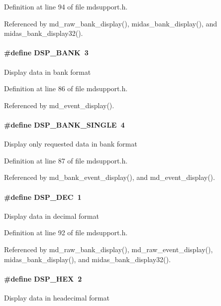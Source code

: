 Definition at line 94 of file mdsupport.h.

Referenced by md\_\-raw\_\-bank\_\-display(), midas\_\-bank\_\-display(), and midas\_\-bank\_\-display32().
\paragraph[{DSP\_\-BANK}]{\setlength{\rightskip}{0pt plus 5cm}\#define DSP\_\-BANK~3}\hfill\label{group__mdsupportdefineh_gab226417737baf78d3965f812b2c58b53}
Display data in bank format 

Definition at line 86 of file mdsupport.h.

Referenced by md\_\-event\_\-display().
\paragraph[{DSP\_\-BANK\_\-SINGLE}]{\setlength{\rightskip}{0pt plus 5cm}\#define DSP\_\-BANK\_\-SINGLE~4}\hfill\label{group__mdsupportdefineh_ga818a76e5aea53754826cdf8753c5e94f}
Display only requested data in bank format 

Definition at line 87 of file mdsupport.h.

Referenced by md\_\-bank\_\-event\_\-display(), and md\_\-event\_\-display().
\paragraph[{DSP\_\-DEC}]{\setlength{\rightskip}{0pt plus 5cm}\#define DSP\_\-DEC~1}\hfill\label{group__mdsupportdefineh_ga5390ad9ba091ef1e98e36b6f090def3b}
Display data in decimal format 

Definition at line 92 of file mdsupport.h.

Referenced by md\_\-raw\_\-bank\_\-display(), md\_\-raw\_\-event\_\-display(), midas\_\-bank\_\-display(), and midas\_\-bank\_\-display32().
\paragraph[{DSP\_\-HEX}]{\setlength{\rightskip}{0pt plus 5cm}\#define DSP\_\-HEX~2}\hfill\label{group__mdsupportdefineh_gab656768737f9e3f933cb2929958f4832}
Display data in headecimal format 

